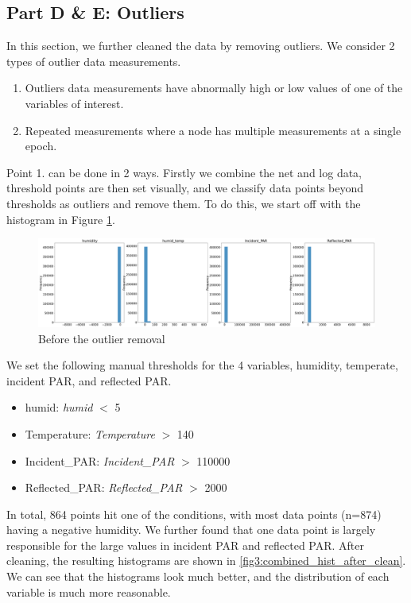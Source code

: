 \documentclass[11pt, letterpaper]{article}
\begin{document}
\subsection{Part D \& E: Outliers}
In this section, we further cleaned the data by removing outliers. We consider 2 types of outlier data measurements. 
\begin{enumerate}
    \item Outliers data measurements have abnormally high or low values of one of the variables of interest.
    \item Repeated measurements where a node has multiple measurements at a single epoch.
\end{enumerate}
Point 1. can be done in 2 ways. Firstly we combine the net and log data, threshold points are then set visually, and we classify data points beyond thresholds as outliers and remove them. To do this, we start off with the histogram in Figure \ref{fig3:combined_hist}. 

\begin{figure}[h!]
\centering
\includegraphics[width=1.0\textwidth]{Fig3_combined_hist.png}
\caption{Before the outlier removal}
\label{fig3:combined_hist}
\end{figure}

We set the following manual thresholds for the 4  variables, humidity, temperate, incident PAR, and reflected PAR.

\begin{itemize}
    \item humid: \textit{humid} $<$ 5
    \item Temperature: \textit{Temperature} $>$  140
    \item Incident\_PAR: \textit{Incident\_PAR} $>$  110000
    \item Reflected\_PAR: \textit{Reflected\_PAR} $>$  2000
\end{itemize}
In total, 864 points hit one of the conditions, with most data points (n=874) having a negative humidity. We further found that one data point is largely responsible for the large values in incident PAR and reflected PAR. After cleaning, the resulting histograms are shown in \ref{fig3:combined_hist_after_clean}. We can see that the histograms look much better, and the distribution of each variable is much more reasonable.
\end{document}
